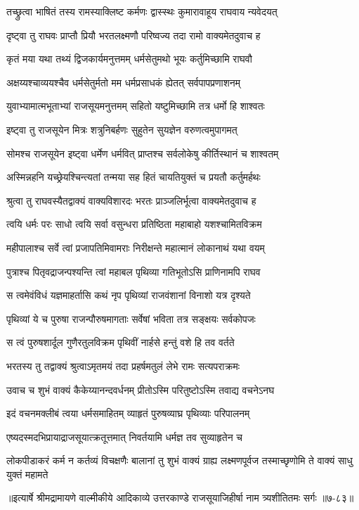 
\twolineshloka
{तच्छ्रुत्वा भाषितं तस्य रामस्याक्लिष्ट कर्मणः}
{द्वास्स्थः कुमारावाहूय राघवाय न्यवेदयत्} %

\twolineshloka
{दृष्ट्वा तु राघवः प्राप्तौ प्रियौ भरतलक्ष्मणौ}
{परिष्वज्य तदा रामो वाक्यमेतदुवाच ह} %

\twolineshloka
{कृतं मया यथा तथ्यं द्विजकार्यमनुत्तमम्}
{धर्मसेतुमथो भूयः कर्तुमिच्छामि राघवौ} %

\twolineshloka
{अक्षय्यश्चाव्ययश्चैव धर्मसेतुर्मतो मम}
{धर्मप्रसाधकं ह्येतत् सर्वपापप्रणाशनम्} %

\twolineshloka
{युवाभ्यामात्मभूताभ्यां राजसूयमनुत्तमम्}
{सहितो यष्टुमिच्छामि तत्र धर्मो हि शाश्वतः} %

\twolineshloka
{इष्ट्वा तु राजसूयेन मित्रः शत्रुनिबर्हणः}
{सुहुतेन सुयज्ञेन वरुणत्वमुपागमत्} %

\twolineshloka
{सोमश्च राजसूयेन इष्ट्वा धर्मेण धर्मवित्}
{प्राप्तश्च सर्वलोकेषु कीर्तिस्थानं च शाश्वतम्} %

\twolineshloka
{अस्मिन्नहनि यच्छ्रेयश्चिन्त्यतां तन्मया सह}
{हितं चायतियुक्तं च प्रयतौ कर्तुमर्हथः} %

\twolineshloka
{श्रुत्वा तु राघवस्यैतद्वाक्यं वाक्यविशारदः}
{भरतः प्राञ्जलिर्भूत्वा वाक्यमेतदुवाच ह} %

\twolineshloka
{त्वयि धर्मः परः साधो त्वयि सर्वा वसुन्धरा}
{प्रतिष्ठिता महाबाहो यशश्चामितविक्रम} %

\twolineshloka
{महीपालाश्च सर्वे त्वां प्रजापतिमिवामराः}
{निरीक्षन्ते महात्मानं लोकानाथं यथा वयम्} %

\twolineshloka
{पुत्राश्च पितृवद्राजन्पश्यन्ति त्वां महाबल}
{पृथिव्या गतिभूतोऽसि प्राणिनामपि राघव} %

\twolineshloka
{स त्वमेवंविधं यज्ञमाहर्तासि कथं नृप}
{पृथिव्यां राजवंशानां विनाशो यत्र दृश्यते} %

\twolineshloka
{पृथिव्यां ये च पुरुषा राजन्पौरुषमागताः}
{सर्वेषां भविता तत्र सङ्क्षयः सर्वकोपजः} %

\twolineshloka
{स त्वं पुरुषशार्दूल गुणैरतुलविक्रम}
{पृथिवीं नार्हसे हन्तुं वशे हि तव वर्तते} %

\twolineshloka
{भरतस्य तु तद्वाक्यं श्रुत्वाऽमृतमयं तदा}
{प्रहर्षमतुलं लेभे रामः सत्यपराक्रमः} %

\twolineshloka
{उवाच च शुभं वाक्यं कैकेय्यानन्दवर्धनम्}
{प्रीतोऽस्मि परितुष्टोऽस्मि तवाद्य वचनेऽनघ} %

\twolineshloka
{इदं वचनमक्लीबं त्वया धर्मसमाहितम्}
{व्याहृतं पुरुषव्याघ्र पृथिव्याः परिपालनम्} %

\twolineshloka
{एष्यदस्मदभिप्रायाद्राजसूयात्क्रतूत्तमात्}
{निवर्तयामि धर्मज्ञ तव सुव्याहृतेन च} %

\threelineshloka
{लोकपीडाकरं कर्म न कर्तव्यं विचक्षणैः}
{बालानां तु शुभं वाक्यं ग्राह्य लक्ष्मणपूर्वज}
{तस्माच्छृणोमि ते वाक्यं साधु युक्तं महामते} %


॥इत्यार्षे श्रीमद्रामायणे वाल्मीकीये आदिकाव्ये उत्तरकाण्डे राजसूयाजिहीर्षा नाम त्र्यशीतितमः सर्गः ॥७-८३॥

